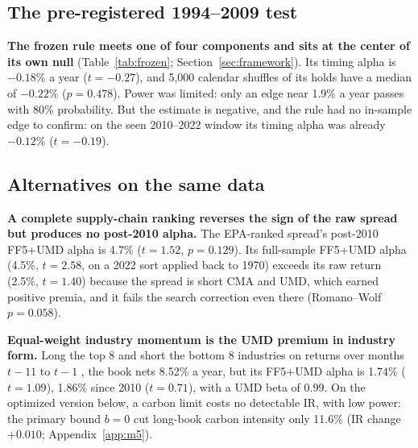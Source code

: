 \subsection{The pre-registered 1994--2009 test}
\label{sec:frozen}

\textbf{The frozen rule meets one of four components and sits at the center of its own null} (Table~\ref{tab:frozen}; Section~\ref{sec:framework}). Its timing alpha is $-0.18$\% a year ($t=-0.27$), and 5,000 calendar shuffles of its holds have a median of $-0.22$\% ($p=0.478$). Power was limited: only an edge near 1.9\% a year passes with 80\% probability. But the estimate is negative, and the rule had no in-sample edge to confirm: on the seen 2010--2022 window its timing alpha was already $-0.12$\% ($t=-0.19$).

\begin{table}[!tb]
\caption{The frozen 1994--2009 test: the pre-registered pass bar for the EMV-share rule and, for context, our team's own signal lagged one month. All four components had to pass; both signals fail.}
\label{tab:frozen}
\centering\scriptsize
\setlength{\tabcolsep}{3.5pt}

\end{table}

\subsection{Alternatives on the same data}
\label{sec:alternatives}

\textbf{A complete supply-chain ranking reverses the sign of the raw spread but produces no post-2010 alpha.} The EPA-ranked spread's post-2010 FF5+UMD alpha is 4.7\% ($t=1.52$, $p=0.129$). Its full-sample FF5+UMD alpha (4.5\%, $t=2.58$, on a 2022 sort applied back to 1970) exceeds its raw return (2.5\%, $t=1.40$) because the spread is short CMA and UMD, which earned positive premia, and it fails the search correction even there (Romano--Wolf $p=0.058$).

\textbf{Equal-weight industry momentum is the UMD premium in industry form.} Long the top 8 and short the bottom 8 industries on returns over months $t-11$ to $t-1$ \citep{mg1999}, the book nets 8.52\% a year, but its FF5+UMD alpha is 1.74\% ($t=1.09$), 1.86\% since 2010 ($t=0.71$), with a UMD beta of 0.99. On the optimized version below, a carbon limit costs no detectable IR, with low power: the primary bound $b=0$ cut long-book carbon intensity only 11.6\% (IR change $+0.010$; Appendix~\ref{app:m5}).

